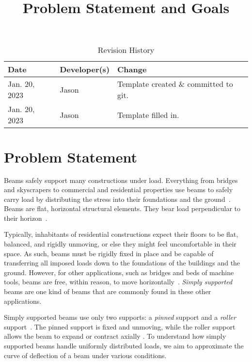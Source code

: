 \documentclass{article}
\title{Problem Statement and Goals\\\progname{}}
\author{\authname}
\date{}
\begin{document}
\maketitle

\begin{table}[hp]
    \caption{Revision History} \label{TblRevisionHistory}
    \begin{tabularx}{\textwidth}{llX}
        \toprule
        \textbf{Date} & \textbf{Developer(s)} & \textbf{Change}                       \\
        \midrule
        Jan. 20, 2023 & Jason                 & Template created \& committed to git. \\
        Jan. 20, 2023 & Jason                 & Template filled in.                   \\
        \bottomrule
    \end{tabularx}
\end{table}

\section{Problem Statement}
\label{problem-statement}

Beams safely support many constructions under load. Everything from bridges and
skyscrapers to commercial and residential properties use beams to safely carry
load by distributing the stress into their foundations and the ground\
\cite{Moscovitch2020}. Beams are flat, horizontal structural elements. They bear
load perpendicular to their horizon\ \cite{Moscovitch2020}.

Typically, inhabitants of residential constructions expect their floors to be
flat, balanced, and rigidly unmoving, or else they might feel uncomfortable in
their space. As such, beams must be rigidly fixed in place and be capable of
transferring all imposed loads down to the foundations of the buildings and the
ground. However, for other applications, such as bridges and beds of machine
tools, beams are free, within reason, to move horizontally\
\cite{BirdChivers1993}. \textit{Simply supported} beams are one kind of beams
that are commonly found in these other applications.

Simply supported beams use only two supports: a \textit{pinned} support and a
\textit{roller} support\ \cite{Lemonis2022}. The pinned support is fixed and
unmoving, while the roller support allows the beam to expand or contract axially
\cite{Lemonis2022}. To understand how simply supported beams handle uniformly
distributed loads, we aim to approximate the curve of deflection of a beam under
various conditions.
\end{document}
